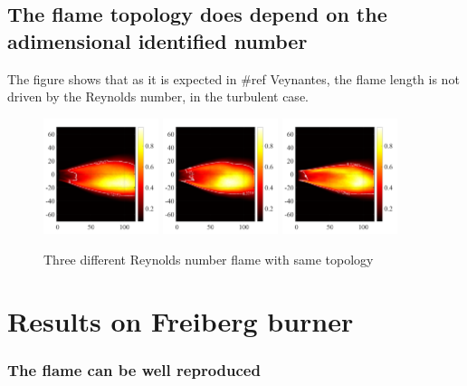\subsection{The flame topology does depend on the adimensional identified number }
The figure \label{fig_power_comparison} shows that as it is expected in \#ref Veynantes, the flame length is not driven by the Reynolds number, in the
turbulent case.
 \begin{figure}[!h]
  \centering
\includegraphics[width=0.3\textwidth]{fig/puissance/DSC_3683puissance.png}
\includegraphics[width=0.3\textwidth]{fig/puissance/DSC_3689puissance.png}
\includegraphics[width=0.3\textwidth]{fig/puissance/DSC_3694puissance.png}
  \caption{Three different Reynolds number flame with same topology}
 \label{fig_power_comparison}
\end{figure}



\section{Results on Freiberg burner}
\subsubsection{The flame can be well reproduced}
